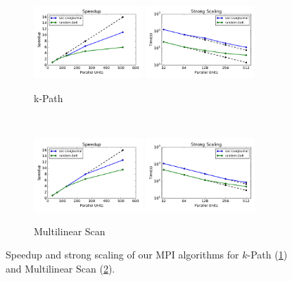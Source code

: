 \begin{figure}[ht]
  \centering
  \begin{subfigure}[b]{\textwidth}
    \centering
    \includegraphics[width=0.45\textwidth]{img/speedup-kpath.pdf}
    \includegraphics[width=0.45\textwidth]{img/strong-scaling-kpath.pdf}
    \caption{\label{fig:scale-kpath} k-Path}
  \end{subfigure}\\
  
  \begin{subfigure}[b]{\textwidth}
    \centering
    \includegraphics[width=0.45\textwidth]{img/speedup-multilinear.pdf}
    \includegraphics[width=0.45\textwidth]{img/strong-scaling-multilinear.pdf}
    \caption{\label{fig:scale-multilinear} Multilinear Scan}
  \end{subfigure}%
  \caption{Speedup and strong scaling of our MPI algorithms for $k$-Path (\ref{fig:scale-kpath}) and Multilinear Scan (\ref{fig:scale-multilinear}).}
 \label{fig:scaling}
\end{figure}

